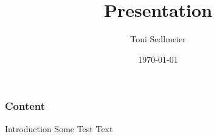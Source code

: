 \documentclass{beamer}
\title{Presentation}
\author{Toni Sedlmeier}
\institute{TH Nuremberg}
\date{\today}
\begin{document}
\begin{frame}
\titlepage
\end{frame}

\begin{frame}
\frametitle{Content}
\tableofcontents
\end{frame}

\begin{frame}{Introduction}
    Some Test Text
\end{frame}
\end{document}
